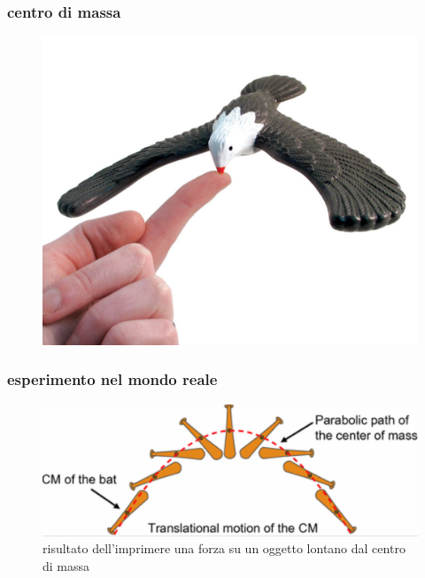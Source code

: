 \documentclass{beamer}
\begin{document}
\begin{frame}
\frametitle{centro di massa}
\begin{figure}
\includegraphics[scale=0.25]{./images/bird}
\end{figure}
\end{frame}

\begin{frame}
\frametitle{esperimento nel mondo reale}
\begin{figure}
\includegraphics[scale=0.33]{./images/bat}
\caption{risultato dell'imprimere una forza su un oggetto lontano dal centro di massa}
\end{figure}
\end{frame}
\end{document}
